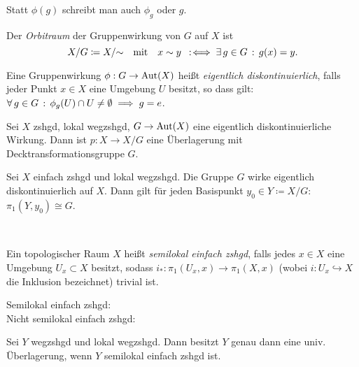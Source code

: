 \documentclass{cheat-sheet}
\begin{document}
\begin{nota}
  Statt $\phi(g)$ schreibt man auch $\phi_g$ oder $g$.
\end{nota}

\begin{defn}
  Der \emph{Orbitraum} der Gruppenwirkung von $G$ auf $X$ ist
  \[
    X / G \coloneqq X / {\sim}
    \quad \text{mit} \quad
    x \sim y \enspace:\!\iff \exists \, {g \in G} \,:\, g(x) = y.
  \]
\end{defn}


\begin{defn}
  Eine Gruppenwirkung $\phi : G \to \operatorname{Aut}(X)$ heißt \emph{eigentlich diskontinuierlich}, falls jeder Punkt $x \in X$ eine Umgebung $U$ besitzt, so dass gilt: $\forall \, {g \in G} \,:\, \phi_g(U) \cap U \not= \emptyset \implies g = e$.
\end{defn}

\begin{prop}
  Sei $X$ zshgd, lokal wegzshgd, $G \to \operatorname{Aut}(X)$ eine eigentlich diskontinuierliche Wirkung. Dann ist $p : X \to X/G$ eine Überlagerung mit Decktransformationsgruppe $G$.
\end{prop}

\begin{satz}
  Sei $X$ einfach zshgd und lokal wegzshgd. Die Gruppe $G$ wirke eigentlich diskontinuierlich auf $X$. Dann gilt für jeden Basispunkt $y_0 \in Y \coloneqq X / G$: $\pi_1(Y, y_0) \cong G$.
\end{satz}

\begin{bspe}
   \enspace
   \\
\end{bspe}

\begin{defn}
  Ein topologischer Raum $X$ heißt \emph{semilokal einfach zshgd}, falls jedes $x \in X$ eine Umgebung $U_x \subset X$ besitzt, sodass $i_* : \pi_1(U_x, x) \to \pi_1(X, x)$ (wobei $i : U_x \hookrightarrow X$ die Inklusion bezeichnet) trivial ist.
\end{defn}

\begin{bspe}
  Semilokal einfach zshgd: \enspace
   \enspace
   \\
  Nicht semilokal einfach zshgd: \enspace
\end{bspe}

\begin{satz}
  Sei $Y$ wegzshgd und lokal wegzshgd. Dann besitzt $Y$ genau dann eine univ. Überlagerung, wenn $Y$ semilokal einfach zshgd ist.
\end{satz}
\end{document}
